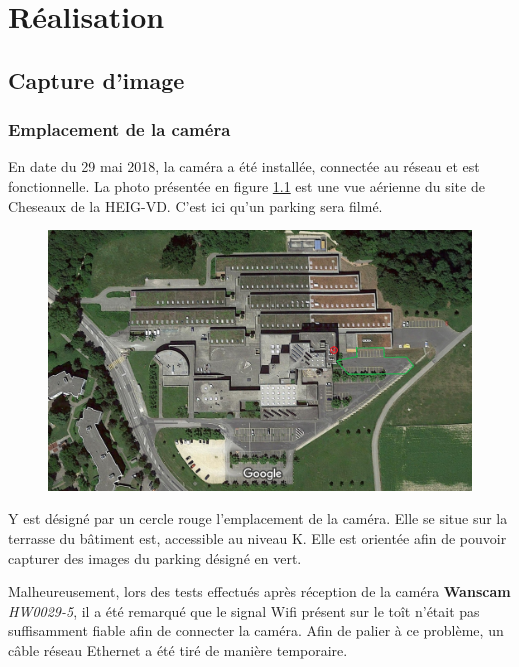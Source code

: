 \chapter{Réalisation}\label{realisation}


\section{Capture d'image}\label{realisation.capture}
\subsection{Emplacement de la caméra}
En date du 29 mai 2018, la caméra a été installée, connectée au réseau et est fonctionnelle. La photo présentée en figure \ref{fig:cam_parking_annotation} est une vue aérienne du site de Cheseaux de la HEIG-VD. C'est ici qu'un parking sera filmé.

\begin{figure}[H]
    \includegraphics[width=130mm]{img/conception/cam_parking_location.png}
    \label{fig:cam_parking_annotation}
    \centering
\end{figure} 

Y est désigné par un cercle rouge l'emplacement de la caméra. Elle se situe sur la terrasse du bâtiment est, accessible au niveau K. Elle est orientée afin de pouvoir capturer des images du parking désigné en vert. 

Malheureusement, lors des tests effectués après réception de la caméra \textbf{Wanscam} \textit{HW0029-5}, il a été remarqué que le signal Wifi présent sur le toît n'était pas suffisamment fiable afin de connecter la caméra. Afin de palier à ce problème, un câble réseau Ethernet a été tiré de manière temporaire.


